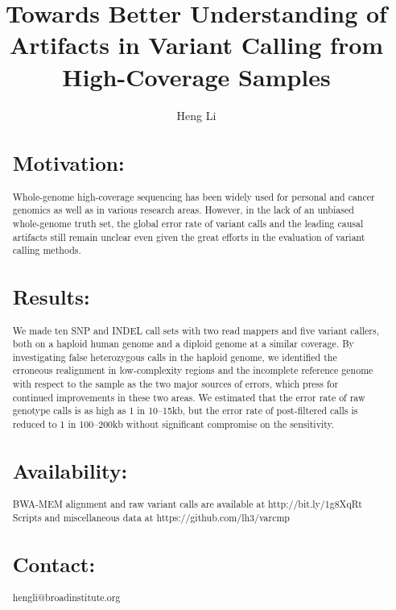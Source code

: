 \documentclass{bioinfo-ori}
\begin{document}

\title[Artifacts in variant calling]{Towards Better Understanding of Artifacts in Variant Calling from High-Coverage Samples}
\author[Li]{Heng Li}

\address{Broad Institute of Harvard and MIT, 7 Cambridge Center, Cambridge, MA 02142, USA}

\maketitle

\begin{abstract}

\section{Motivation:} Whole-genome high-coverage sequencing has been widely
used for personal and cancer genomics as well as in various research areas.
However, in the lack of an unbiased whole-genome truth set, the global error
rate of variant calls and the leading causal artifacts still remain unclear
even given the great efforts in the evaluation of variant calling methods.

\section{Results:} We made ten SNP and INDEL call sets with two read mappers
and five variant callers, both on a haploid human genome and a diploid genome
at a similar coverage. By investigating false heterozygous calls in the haploid
genome, we identified the erroneous realignment in low-complexity regions and
the incomplete reference genome with respect to the sample as the two major
sources of errors, which press for continued improvements in these two areas.
We estimated that the error rate of raw genotype calls is as high as 1 in
10--15kb, but the error rate of post-filtered calls is reduced to 1 in
100--200kb without significant compromise on the sensitivity.

\section{Availability:} BWA-MEM alignment and raw variant calls are available at http://bit.ly/1g8XqRt
Scripts and miscellaneous data at https://github.com/lh3/varcmp

\section{Contact:} hengli@broadinstitute.org

\end{abstract}
\end{document}
